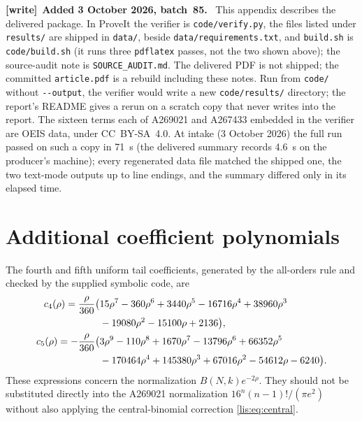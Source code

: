 \documentclass[11pt,letterpaper]{article}
\numberwithin{equation}{section}
\theoremstyle{definition}
\newenvironment{writenote}[1][]{\par\smallskip\begingroup\small
 \noindent\textbf{[write]}\if\relax\detokenize{#1}\relax\else~\textbf{#1.}\fi\ }%
 {\par\endgroup\smallskip}
\begin{document}
\begin{writenote}[Added 3 October 2026, batch~85]
This appendix describes the delivered package. In ProveIt the verifier
is \texttt{code/verify.py}, the files listed under \texttt{results/} are
shipped in \texttt{data/}, beside \texttt{data/requirements.txt}, and
\texttt{build.sh} is \texttt{code/build.sh} (it runs three
\texttt{pdflatex} passes, not the two shown above); the source-audit note
is \texttt{SOURCE\_AUDIT.md}. The delivered PDF is not shipped; the
committed \texttt{article.pdf} is a rebuild including these notes. Run
from \texttt{code/} without \texttt{-{}-output}, the verifier would write
a new \texttt{code/results/} directory; the report's README gives a rerun
on a scratch copy that never writes into the report. The sixteen terms
each of A269021 and A267433 embedded in the verifier are OEIS data, under
CC~BY-SA~4.0. At intake (3 October 2026) the full run passed on such a
copy in 71~s (the delivered summary records 4.6~s on the producer's
machine); every regenerated data file matched the shipped one, the two
text-mode outputs up to line endings, and the summary differed only in
its elapsed time.
\end{writenote}

\section{Additional coefficient polynomials}
The fourth and fifth uniform tail coefficients, generated by the
all-orders rule and checked by the supplied symbolic code, are
\begin{align}
 c_4(\rho)=\frac{\rho}{360}\big(&15\rho^7-360\rho^6+3440\rho^5
 -16716\rho^4+38960\rho^3\notag\\
 &-19080\rho^2-15100\rho+2136\big),\label{lis:eq:c4}\\
 c_5(\rho)=-\frac{\rho}{360}\big(&3\rho^9-110\rho^8+1670\rho^7
 -13796\rho^6+66352\rho^5\notag\\
 &-170464\rho^4+145380\rho^3+67016\rho^2
 -54612\rho-6240\big).\label{lis:eq:c5}
\end{align}
These expressions concern the normalization $B(N,k)e^{-2\rho}$.
They should not be substituted directly into the A269021 normalization
$16^n(n-1)!/(\pi e^2)$ without also applying the central-binomial
correction \eqref{lis:eq:central}.
\end{document}
